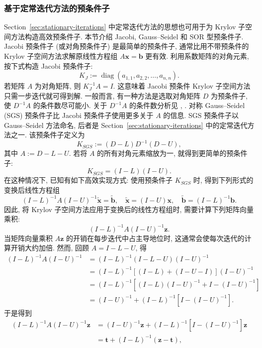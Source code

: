 \subsubsection{{基于定常迭代方法的预条件子}}\label{subsec:stationary-preconditioners}
{Section\ \ref{sec:stationary-iterations} 中定常迭代方法的思想也可用于为 Krylov 子空间方法构造高效预条件子. 本节介绍 Jacobi, Gauss--Seidel 和 SOR 型预条件子.}
{\leavevmode{}\label{idx:chapter-03-section-05:jacobi-preconditioner}Jacobi 预条件子 (或对角预条件子) 是最简单的预条件子, 通常比用不带预条件的 Krylov 子空间方法求解原线性方程组 $A\bm x=\bm b$ 更有效. 利用系数矩阵的对角元素, 按下式构造 Jacobi 预条件子:}
\[K_J:=\operatorname{diag}(a_{1,1},a_{2,2},\ldots,a_{n,n}).\]
{若矩阵 $A$ 为对角矩阵, 则 $K_J^{-1}A=I$. 这意味着 Jacobi 预条件 Krylov 子空间方法只需一步迭代就可得到解. 一般而言, 有一种方法是选取对角矩阵 $D$ 为预条件子, 使 $D^{-1}A$ 的条件数尽可能小. 关于 $D^{-1}A$ 的条件数分析见 , .}
{\leavevmode{}\label{idx:chapter-03-section-05:sgs-preconditioner}对称 Gauss--Seidel (SGS) 预条件子比 Jacobi 预条件子使用更多关于 $A$ 的信息. SGS 预条件子以 Gauss--Seidel 方法命名, 后者是 Section\ \ref{sec:stationary-iterations} 中的定常迭代方法之一. 该预条件子定义为}
\[K_{SGS}:=(D-L)D^{-1}(D-U),\]
{其中 $A:=D-L-U$. 若将 $A$ 的所有对角元素缩放为一, 就得到更简单的预条件子:}
\[K_{SGS}=(I-L)(I-U).\]
{在这种情况下, 已知有如下高效实现方式: 使用预条件子 $K_{SGS}$ 时, 得到下列形式的变换后线性方程组}
\[(I-L)^{-1}A(I-U)^{-1}\widetilde{\bm x}=\widetilde{\bm b},\quad\widetilde{\bm x}=(I-U)\bm x,\quad\widetilde{\bm b}=(I-L)^{-1}\bm b.\]
{因此, 将 Krylov 子空间方法应用于变换后的线性方程组时, 需要计算下列矩阵向量乘积:}
\[(I-L)^{-1}A(I-U)^{-1}\bm z.\]
{当矩阵向量乘积 $A\bm z$ 的开销在每步迭代中占主导地位时, 这通常会使每次迭代的计算开销大约加倍. 然而, 回顾 $A=I-L-U$, 得}
\[\begin{aligned}(I-L)^{-1}A(I-U)^{-1}&=(I-L)^{-1}(I-L-U)(I-U)^{-1}\\
&=(I-L)^{-1}[(I-L)+(I-U-I)](I-U)^{-1}\\
&=(I-L)^{-1}[(I-L)(I-U)^{-1}+I-(I-U)^{-1}]\\
&=(I-U)^{-1}+(I-L)^{-1}[I-(I-U)^{-1}].\end{aligned}\]
{于是得到}
\[\begin{aligned}(I-L)^{-1}A(I-U)^{-1}\bm z&=(I-U)^{-1}\bm z+(I-L)^{-1}[I-(I-U)^{-1}]\bm z\\&=\bm t+(I-L)^{-1}(\bm z-\bm t),\end{aligned}\]
